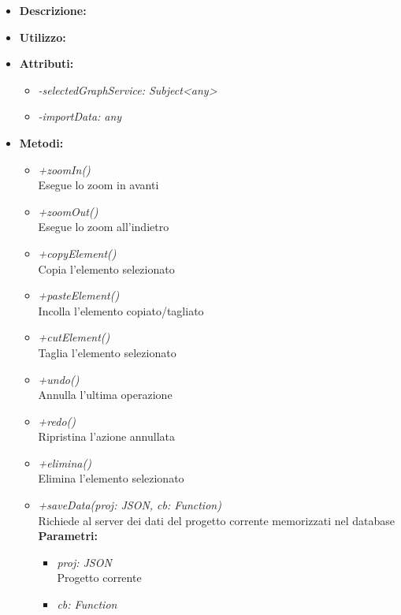 \begin{itemize}
	\item \textbf{Descrizione:}\\
	
	\item \textbf{Utilizzo:}\\
	
	\item \textbf{Attributi:}
		\begin{itemize}
			\item \emph{-selectedGraphService: Subject<any>}\\
			
			\item \emph{-importData: any}\\
			
		\end{itemize}
	\item \textbf{Metodi:}
		\begin{itemize}
			\item \emph{+zoomIn()}\\
    		Esegue lo zoom in avanti
    		\item \emph{+zoomOut()}\\
    		Esegue lo zoom all'indietro
    		\item \emph{+copyElement()}\\
    		Copia l'elemento selezionato
    		\item \emph{+pasteElement()}\\
    		Incolla l'elemento copiato/tagliato
    		\item \emph{+cutElement()}\\
    		Taglia l'elemento selezionato
    		\item \emph{+undo()}\\
    		Annulla l'ultima operazione
    		\item \emph{+redo()}\\
    		Ripristina l'azione annullata
    		\item \emph{+elimina()}\\
    		Elimina l'elemento selezionato
    		\item \emph{+saveData(proj: JSON, cb: Function)}\\
    		Richiede al server dei dati del progetto corrente memorizzati nel database\\
    		\textbf{Parametri:}
    		\begin{itemize}
    			\item \emph{proj: JSON}\\
    			Progetto corrente
    			\item \emph{cb: Function}\\
    			

\end{itemize}
\end{itemize}
\end{itemize}
